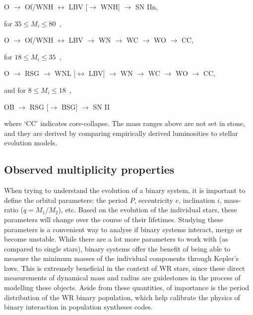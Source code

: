 \centerline{O $\longrightarrow$ Of/WNH $\longleftrightarrow$ LBV  [$\longrightarrow$ WNH] $\longrightarrow$ SN IIn,}

for $35 \le M_i \le 80\,$ \Msun{}, 

\centerline{O $\longrightarrow$ Of/WNH $\longleftrightarrow$ LBV  $\longrightarrow$ WN $\longrightarrow$ WC $\longrightarrow$ WO $\longrightarrow$ CC,}

for $18 \le M_i \le 35\,$ \Msun{},

\centerline{O $\longrightarrow$ RSG $\longrightarrow$ WNL [$\longleftrightarrow$ LBV] $\longrightarrow$ WN $\longrightarrow$ WC $\longrightarrow$ WO $\longrightarrow$ CC,}

and for $8 \le M_i \le 18\,$ \Msun{},

\centerline{OB $\longrightarrow$ RSG [$\longrightarrow$ BSG] $\longrightarrow$ SN II}

where `CC' indicates core-collapse. The mass ranges above are not set in stone, and they are derived by comparing empirically derived luminosities to stellar evolution models. 


\subsection{Observed multiplicity properties}


When trying to understand the evolution of a binary system, it is important to define the orbital parameters: the period $P$, eccentricity $e$, inclination $i$, mass-ratio ($q=M_1/M_2$), etc. Based on the evolution of the individual stars, these parameters will change over the course of their lifetimes. Studying these parameters is a convenient way to analyse if binary systems interact, merge or become unstable. While there are a lot more parameters to work with (as compared to single stars), binary systems offer the benefit of being able to measure the minimum masses of the individual components through Kepler's laws. This is extremely beneficial in the context of WR stars, since these direct measurements of dynamical mass and radius are guidestones in the process of modelling these objects. Aside from these quantities, of importance is the period distribution of the WR binary population, which help calibrate the physics of binary interaction in population syntheses codes. 

